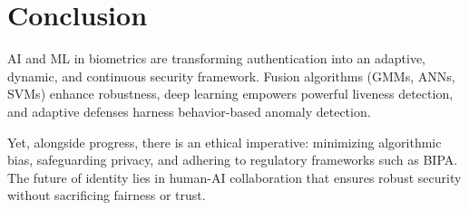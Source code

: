 \documentclass[12pt,a4paper]{report}
\begin{document}
\section{Conclusion}

AI and ML in biometrics are transforming authentication into an adaptive, dynamic, and continuous security framework. Fusion algorithms (GMMs, ANNs, SVMs) enhance robustness, deep learning empowers powerful liveness detection, and adaptive defenses harness behavior-based anomaly detection.  

Yet, alongside progress, there is an ethical imperative: minimizing algorithmic bias, safeguarding privacy, and adhering to regulatory frameworks such as BIPA. The future of identity lies in human-AI collaboration that ensures robust security without sacrificing fairness or trust.
\end{document}

